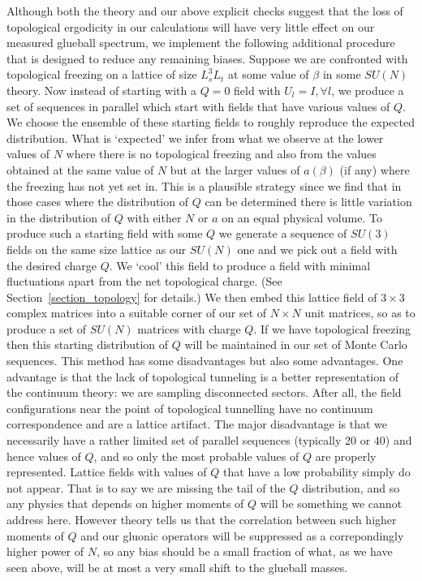\documentclass[12pt]{article}
\begin{document}
Although both the theory and our above explicit checks suggest that the loss of
topological ergodicity in our calculations will have very little effect on
our measured glueball spectrum, we implement the following additional procedure that
is designed to reduce any remaining biases. Suppose we are confronted with 
topological freezing on a lattice of size $L_s^3L_t$ at some value of $\beta$ in some
$SU(N)$ theory. Now instead of starting with a $Q=0$ field with $U_l=I, \forall l$,
we produce a set of sequences in parallel which start with  fields that have various
values of $Q$. We choose the ensemble of these starting fields to roughly reproduce
the expected distribution. What is `expected' we infer from what we observe at the lower
values of $N$ where there is no topological freezing and also from the values obtained
at the same value of $N$ but at the larger values of $a(\beta)$ (if any) where the freezing
has not yet set in. This is a plausible strategy since we find that in those cases
where the distribution of $Q$ can be determined there is little variation
in the distribution of $Q$ with either $N$ or $a$ on an equal physical volume.
To produce such a starting field with some
$Q$ we generate a sequence of $SU(3)$ fields on the same size lattice as our $SU(N)$ one
and we pick out a field with the desired charge $Q$. We `cool' this field
to produce a field with minimal fluctuations apart from the net topological charge.
(See Section~\ref{section_topology} for details.)
We then embed this lattice field of $3\times 3$ complex
matrices into a suitable corner of our set of $N\times N$ unit matrices, so as to produce
a set of $SU(N)$ matrices with charge $Q$. If we have topological freezing then this
starting distribution of $Q$ will be maintained in our set of Monte Carlo sequences.
This method has some disadvantages but also some advantages. One advantage is that
the lack of topological tunneling is a better representation of the continuum
theory: we are sampling disconnected sectors. After all, the field configurations near the
point of topological tunnelling have no continuum correspondence and are a lattice
artifact. The major disadvantage is that we necessarily have a rather limited set of
parallel sequences (typically 20 or 40) and hence values of $Q$, and so only the most
probable values of $Q$ are properly represented. Lattice fields with values of $Q$ that have
a low probability simply do not appear. That is to say we are missing the
tail of the $Q$ distribution, and so any physics that depends on 
higher moments of $Q$ will be something we cannot address here.
However theory tells us that the correlation between such higher moments of $Q$
and our gluonic operators will be suppressed as a correpondingly higher power of $N$,
so any bias should be a small fraction of what, as we have seen above, will be at most
a very small shift to the glueball masses. 
\end{document}
